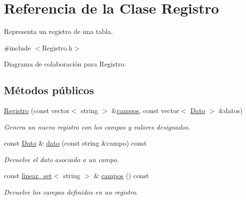\hypertarget{classRegistro}{\section{Referencia de la Clase Registro}
\label{classRegistro}
}


Representa un registro de una tabla.  




{\ttfamily \#include $<$Registro.\+h$>$}



Diagrama de colaboración para Registro\+:
\subsection*{Métodos públicos}
\begin{DoxyCompactItemize}
\item 
\hyperlink{classRegistro_af3717314d0e658a463ffd8ac5b073441}{Registro} (const vector$<$ string $>$ \&\hyperlink{classRegistro_af082664a69c70eb5d29dcad6522242fc}{campos}, const vector$<$ \hyperlink{classDato}{Dato} $>$ \&datos)
\begin{DoxyCompactList}\small\item\em Genera un nuevo registro con los campos y valores designados. \end{DoxyCompactList}\item 
const \hyperlink{classDato}{Dato} \& \hyperlink{classRegistro_a5191c0af2f375525601819cfbb477287}{dato} (const string \&campo) const 
\begin{DoxyCompactList}\small\item\em Devuelve el dato asociado a un campo. \end{DoxyCompactList}\item 
const \hyperlink{classlinear__set}{linear\+\_\+set}$<$ string $>$ \& \hyperlink{classRegistro_af082664a69c70eb5d29dcad6522242fc}{campos} () const 
\begin{DoxyCompactList}\small\item\em Devuelve los campos definidos en un registro. \end{DoxyCompactList}\end{DoxyCompactItemize}
